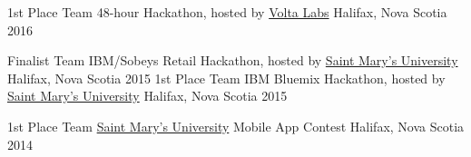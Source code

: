 



\begin{cvhonors}

  \cvhonor
    {1st Place Team} %
    {48-hour Hackathon, hosted by \href{https://voltaeffect.com/}{Volta Labs}} %
    {Halifax, Nova Scotia} %
    {2016} %

  \cvhonor
    {Finalist Team} %
    {IBM/Sobeys Retail Hackathon, hosted by \href{https://www.smu.ca/}{Saint Mary's University}} %
    {Halifax, Nova Scotia} %
    {2015} %
  \cvhonor
    {1st Place Team} %
    {IBM Bluemix Hackathon, hosted by \href{https://www.smu.ca/}{Saint Mary's University}} %
    {Halifax, Nova Scotia} %
    {2015} %

  \cvhonor
    {1st Place Team} %
    {\href{https://www.smu.ca/}{Saint Mary's University} Mobile App Contest} %
    {Halifax, Nova Scotia} %
    {2014} %




\end{cvhonors}
